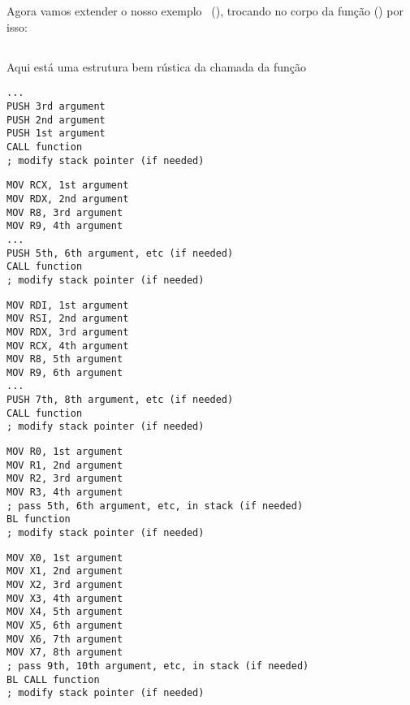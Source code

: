 \section{\PrintfSeveralArgumentsSectionName}

Agora vamos extender o nosso exemplo \IT{\HelloWorldSectionName}~(),
trocando \printf no corpo da função \main() por isso:







\subsection{\Conclusion{}}

Aqui está uma estrutura bem rústica da chamada da função

\begin{lstlisting}[caption=x86]
...
PUSH 3rd argument
PUSH 2nd argument
PUSH 1st argument
CALL function
; modify stack pointer (if needed)
\end{lstlisting}

\begin{lstlisting}[caption=x64 (MSVC)]
MOV RCX, 1st argument
MOV RDX, 2nd argument
MOV R8, 3rd argument
MOV R9, 4th argument
...
PUSH 5th, 6th argument, etc (if needed)
CALL function
; modify stack pointer (if needed)
\end{lstlisting}

\begin{lstlisting}[caption=x64 (GCC)]
MOV RDI, 1st argument
MOV RSI, 2nd argument
MOV RDX, 3rd argument
MOV RCX, 4th argument
MOV R8, 5th argument
MOV R9, 6th argument
...
PUSH 7th, 8th argument, etc (if needed)
CALL function
; modify stack pointer (if needed)
\end{lstlisting}

\begin{lstlisting}[caption=ARM]
MOV R0, 1st argument
MOV R1, 2nd argument
MOV R2, 3rd argument
MOV R3, 4th argument
; pass 5th, 6th argument, etc, in stack (if needed)
BL function
; modify stack pointer (if needed)
\end{lstlisting}

\begin{lstlisting}[caption=ARM64]
MOV X0, 1st argument
MOV X1, 2nd argument
MOV X2, 3rd argument
MOV X3, 4th argument
MOV X4, 5th argument
MOV X5, 6th argument
MOV X6, 7th argument
MOV X7, 8th argument
; pass 9th, 10th argument, etc, in stack (if needed)
BL CALL function
; modify stack pointer (if needed)
\end{lstlisting}

